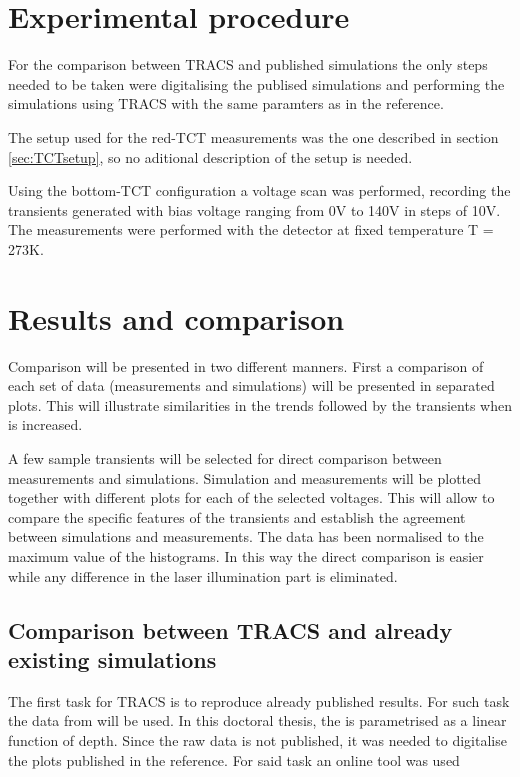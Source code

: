 \section{Experimental procedure} %
\label{sec:ExpProc}

For the comparison between TRACS and published simulations the only steps needed to be taken were digitalising the publised simulations and performing the simulations using TRACS with the same paramters as in the reference. 

The setup used for the red-TCT measurements was the one described in section \ref{sec:TCTsetup}, so no aditional description of the setup is needed. 

Using the bottom-TCT configuration a voltage scan was performed, recording the transients generated with bias voltage ranging from 0V to 140V in steps of 10V. The measurements were performed with the detector at fixed temperature T = 273K. 


\section{Results and comparison} %
\label{sec:comparison}

Comparison will be presented in two different manners. First a comparison of each set of data (measurements and simulations) will be presented in separated plots. This will illustrate similarities in the trends followed by the transients when \vias is increased.

A few sample transients will be selected for direct comparison between measurements and simulations. Simulation and measurements will be plotted together with different plots for each of the selected voltages. This will allow to compare the specific features of the transients and establish the agreement between simulations and measurements. The data has been normalised to the maximum value of the histograms. In this way the direct comparison is easier while any difference in the laser illumination part is eliminated. 


\subsection{Comparison between TRACS and already existing simulations}

The first task for TRACS is to reproduce already published results. For such task the data from \cite{Pholsen} will be used. In this doctoral thesis, the \neff is parametrised as a linear function of depth. Since the raw data is not published, it was needed to digitalise the plots published in the reference. For said task an online tool was used \cite{digitiser}

